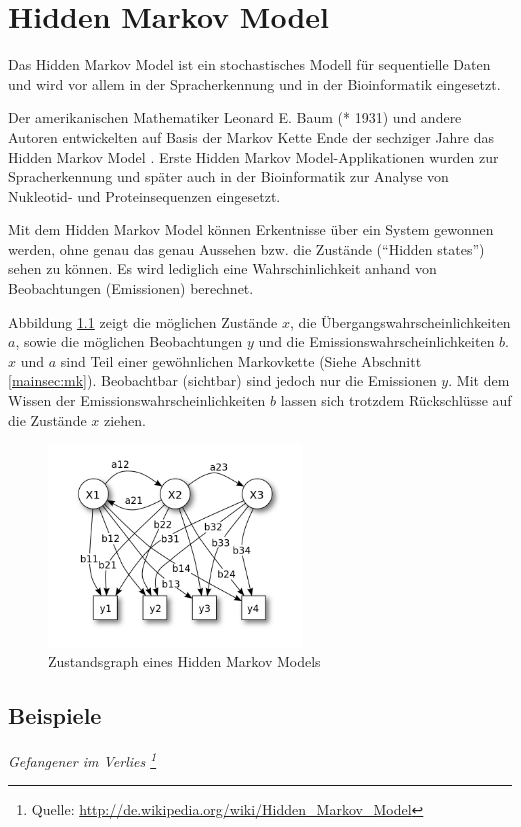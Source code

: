 \chapter{Hidden Markov Model}
\label{mainsec:hmm}

Das Hidden Markov Model ist ein stochastisches Modell für sequentielle Daten und wird vor allem in der Spracherkennung und in der Bioinformatik eingesetzt. 

Der amerikanischen Mathematiker Leonard E. Baum (* 1931) und andere Autoren entwickelten auf Basis der Markov Kette Ende der 
sechziger Jahre das Hidden Markov Model \cite{baum66}. Erste Hidden Markov Model-Applikationen wurden zur Spracherkennung und später auch in der Bioinformatik zur Analyse von Nukleotid- und Proteinsequenzen eingesetzt. 

Mit dem Hidden Markov Model können Erkentnisse über ein System gewonnen werden, ohne genau das genau Aussehen bzw. die Zustände (``Hidden states'') sehen zu können. Es wird lediglich eine Wahrschinlichkeit anhand von Beobachtungen (Emissionen) berechnet. 

Abbildung \ref{fig:hmm_graph} zeigt die möglichen Zustände $x$, die Übergangswahrscheinlichkeiten $a$, sowie die möglichen Beobachtungen $y$ und die Emissionswahrscheinlichkeiten $b$. $x$ und $a$ sind Teil einer gewöhnlichen Markovkette (Siehe Abschnitt \ref{mainsec:mk}). Beobachtbar (sichtbar) sind jedoch nur die Emissionen  $y$. Mit dem Wissen der Emissionswahrscheinlichkeiten $b$ lassen sich trotzdem Rückschlüsse auf die Zustände $x$ ziehen.

\begin{figure}[htbp] \centering
    \includegraphics[width=0.6\textwidth]{Bilder/Kap3/hmm_graph.png}
    \caption{Zustandsgraph eines Hidden Markov Models}
    \label{fig:hmm_graph}
\end{figure}


\section{Beispiele}
\textit{ Gefangener im Verlies \footnote{Quelle: \url{http://de.wikipedia.org/wiki/Hidden_Markov_Model}}} \\

